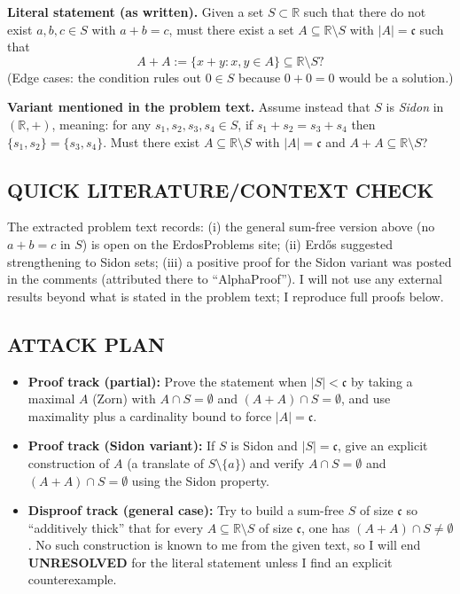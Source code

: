 \medskip
\noindent\textbf{Literal statement (as written).}
Given a set $S\subset\mathbb R$ such that there do not exist $a,b,c\in S$ with $a+b=c$, must there exist a set $A\subseteq\mathbb R\setminus S$ with $|A|=\mathfrak c$ such that
\[
A+A:=\{x+y:x,y\in A\}\subseteq \mathbb R\setminus S?
\]
(Edge cases: the condition rules out $0\in S$ because $0+0=0$ would be a solution.)

\medskip
\noindent\textbf{Variant mentioned in the problem text.}
Assume instead that $S$ is \emph{Sidon} in $(\mathbb R,+)$, meaning:
for any $s_1,s_2,s_3,s_4\in S$, if $s_1+s_2=s_3+s_4$ then $\{s_1,s_2\}=\{s_3,s_4\}$.
Must there exist $A\subseteq\mathbb R\setminus S$ with $|A|=\mathfrak c$ and $A+A\subseteq\mathbb R\setminus S$?

\subsection*{QUICK LITERATURE/CONTEXT CHECK}
The extracted problem text records:
(i) the general sum-free version above (no $a+b=c$ in $S$) is open on the ErdosProblems site;
(ii) Erd\H{o}s suggested strengthening to Sidon sets;
(iii) a positive proof for the Sidon variant was posted in the comments (attributed there to ``AlphaProof'').
I will not use any external results beyond what is stated in the problem text; I reproduce full proofs below.

\subsection*{ATTACK PLAN}
\begin{itemize}
\item \textbf{Proof track (partial):} Prove the statement when $|S|<\mathfrak c$ by taking a maximal $A$ (Zorn) with $A\cap S=\emptyset$ and $(A+A)\cap S=\emptyset$, and use maximality plus a cardinality bound to force $|A|=\mathfrak c$.
\item \textbf{Proof track (Sidon variant):} If $S$ is Sidon and $|S|=\mathfrak c$, give an explicit construction of $A$ (a translate of $S\setminus\{a\}$) and verify $A\cap S=\emptyset$ and $(A+A)\cap S=\emptyset$ using the Sidon property.
\item \textbf{Disproof track (general case):} Try to build a sum-free $S$ of size $\mathfrak c$ so ``additively thick'' that for every $A\subseteq\mathbb R\setminus S$ of size $\mathfrak c$, one has $(A+A)\cap S\neq\emptyset$. No such construction is known to me from the given text, so I will end \textbf{UNRESOLVED} for the literal statement unless I find an explicit counterexample.
\end{itemize}

